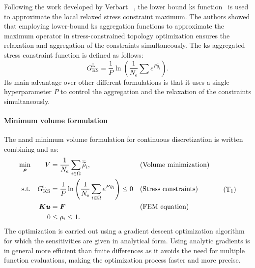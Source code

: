 Following the work developed by Verbart \etal~, the lower bound \gls{ks} function~ is used to approximate the local relaxed stress constraint maximum. The authors showed that employing lower-bound \gls{ks} aggregation functions to approximate the maximum operator in stress-constrained topology optimization ensures the relaxation and aggregation of the constraints simultaneously. The \gls{ks} aggregated stress constraint function is defined as follows:
\begin{equation} 
    G_{\text{KS}}^\text{L} = \frac{1}{P} \ln{\left( \frac{1}{N_\text{e}} \sum e^{{P}\bar{g}_i} \right)}.
    \label{eq:03_gksl}
\end{equation}
Its main advantage over other different formulations is that it uses a single hyperparameter $P$ to control the aggregation and the relaxation of the constraints simultaneously.

\paragraph{Minimum volume formulation}
The \gls{nand} minimum volume formulation for continuous discretization is written combining  and  as:
\begin{equation}
    \begin{aligned}
    \min_{\bm{\rho}}         && V &= \frac{1}{N_{e}} \sum_{i \in \Omega} \rhophys_i, && \text{(Volume minimization)} \\
    \textrm{s.t.}   && G_{\text{KS}}^\text{L} &= \frac{1}{P} \ln{\left( \frac{1}{N_\text{e}} \sum_{i \in \Omega} e^{{P}\bar{g}_i} \right)} \leq 0 && \textrm{(Stress constraints)}\\
    && \bm{K}\bm{u} &= \bm{F} && \textrm{(FEM equation)}\\
    && 0 &\leq \rho_i \leq 1. \\
    \end{aligned}
    \tag{$\mathbb{T}_1$}
    \label{eq:03_prob-stress}
\end{equation}
The optimization is carried out using a gradient descent optimization algorithm for which the sensitivities are given in analytical form. Using analytic gradients is in general more efficient than finite differences as it avoids the need for multiple function evaluations, making the optimization process faster and more precise.

